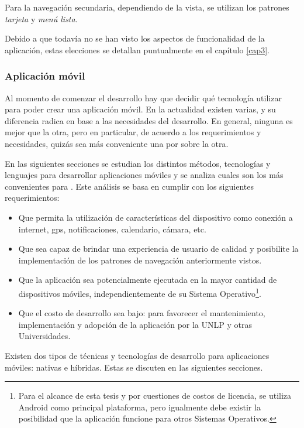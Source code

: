 Para la navegación secundaria, dependiendo de la vista, se utilizan los patrones \textit{tarjeta} y \textit{menú lista}. 

Debido a que todavía no se han visto los aspectos de funcionalidad de la aplicación, estas elecciones se detallan puntualmente en el capítulo \ref{cap3}.

\subsubsection{Aplicación móvil}
\label{aplicacion_movil}

Al momento de comenzar el desarrollo hay que decidir qué tecnología utilizar para poder crear una aplicación móvil. En la actualidad existen varias, y su diferencia radica en base a las necesidades del desarrollo.
En general, ninguna es mejor que la otra, pero en particular, de acuerdo a los requerimientos y necesidades, quizás sea más conveniente una por sobre la otra. 

En las siguientes secciones se estudian los distintos métodos, tecnologías y lenguajes para desarrollar aplicaciones móviles y se analiza cuales son los más convenientes para \nombreApp.
Este análisis se basa en cumplir con los siguientes requerimientos:
\begin{itemize}
\item Que permita la utilización de características del dispositivo como conexión a internet, \gls{gps}, notificaciones, calendario, cámara, etc.
\item Que sea capaz de brindar una experiencia de usuario de calidad y posibilite la implementación de los patrones de navegación anteriormente vistos.
\item Que la aplicación sea potencialmente ejecutada en la mayor cantidad de dispositivos móviles, independientemente de su Sistema Operativo\footnote{ Para el alcance de esta tesis y por cuestiones de costos de licencia, se utiliza Android como principal plataforma, pero igualmente debe existir la posibilidad que la aplicación funcione para otros Sistemas Operativos.}.
\item Que el costo de desarrollo sea bajo: para favorecer el mantenimiento, implementación y adopción de la aplicación por la UNLP y otras Universidades.
\end{itemize}

Existen dos tipos de técnicas y tecnologías de desarrollo para aplicaciones móviles: nativas e híbridas. Estas se discuten en las siguientes secciones.

